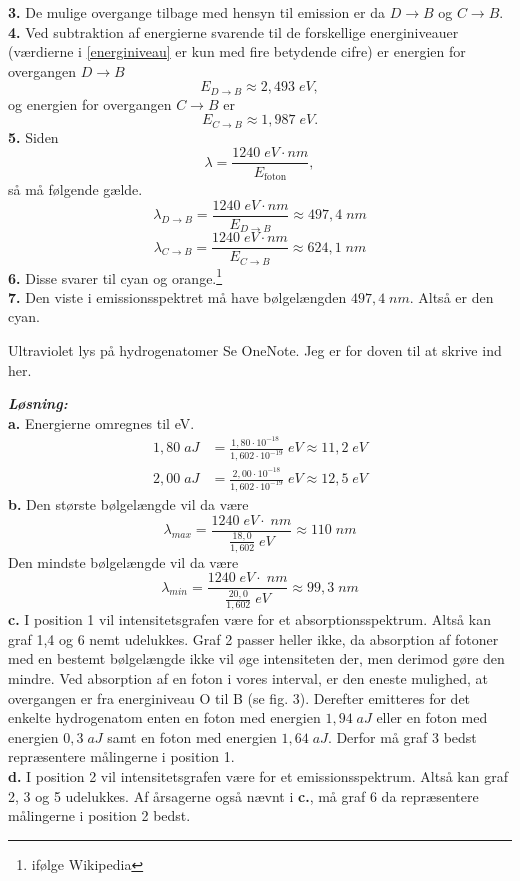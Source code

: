 \documentclass{report}
\newcommand{\sol}{\setlength{\parindent}{0cm}\textbf{\textit{Løsning:}}\setlength{\parindent}{1cm}}
\begin{document}
\noindent \textbf{3.} De mulige overgange tilbage med hensyn til emission er da $D\rightarrow B$ og $C\rightarrow B$.\\[1ex]
\textbf{4.} Ved subtraktion af energierne svarende til de forskellige energiniveauer (værdierne i \cref{energiniveau} er kun med fire betydende cifre) er energien for overgangen $D\rightarrow B$
\[
E_{D\rightarrow B} \approx 2,493 \;\unit{eV} ,
\] 
og energien for overgangen $C\rightarrow B$ er
\[
E _{C\rightarrow B}\approx 1,987 \;\unit{eV}.
\] 
\textbf{5.} Siden 
\[
\lambda = \frac{1240 \;\unit{eV}\cdot \unit{nm} }{E_{\text{foton}}},
\] 
så må følgende gælde.
\[
\lambda_{D\rightarrow B} = \frac{1240 \;\unit{eV}\cdot \unit{nm} }{E_{D\rightarrow B}} \approx 497,4 \;\unit{nm} 
\] 
\[
\lambda_{C\rightarrow B} = \frac{1240 \;\unit{eV}\cdot \unit{nm} }{E_{C\rightarrow B}} \approx 624,1\;\unit{nm} 
\] 
\textbf{6.} Disse svarer til cyan og orange.\footnote{ifølge Wikipedia}\\[1ex]
\textbf{7.} Den viste i emissionsspektret må have bølgelængden $497,4 \;\unit{nm} $. Altså er den cyan.
\begin{question}{Ultraviolet lys på hydrogenatomer}{}
Se OneNote. Jeg er for doven til at skrive ind her.
\end{question}
\sol \\ 
\textbf{a.} Energierne omregnes til \unit{eV}.
\begin{equation*}
\begin{split}
  1,80 \;\unit{aJ}&=\frac{1,80\cdot 10^{-18}\;}{1,602\cdot 10^{-19}} \;\unit{eV} \approx 11,2 \;\unit{eV} \\
  2,00 \;\unit{aJ}&=\frac{2,00\cdot 10^{-18}}{1,602\cdot 10^{-19}} \;\unit{eV} \approx 12,5 \;\unit{eV} 
\end{split}
\end{equation*}
\textbf{b.} Den største bølgelængde vil da være
\[
\lambda_{max}=\frac{1240 \;\unit{eV} \cdot \;\unit{nm} }{\frac{18,0}{1,602}\;\unit{eV} } \approx 110 \;\unit{nm}
\] 
Den mindste bølgelængde vil da være
\[
\lambda_{min}=\frac{1240 \;\unit{eV} \cdot \;\unit{nm} }{\frac{20,0}{1,602}\;\unit{eV} } \approx 99,3\;\unit{nm}
\] 
\textbf{c.} I position 1 vil intensitetsgrafen være for et absorptionsspektrum. Altså kan graf 1,4 og 6 nemt udelukkes. 
Graf 2 passer heller ikke, da absorption af fotoner med en bestemt bølgelængde ikke vil øge intensiteten der, men derimod gøre den mindre.
Ved absorption af en foton i vores interval, er den eneste mulighed, at overgangen er fra energiniveau O til B (se fig. 3). 
Derefter emitteres for det enkelte hydrogenatom enten en foton med energien $1,94 \;\unit{aJ} $ eller en foton med energien $0,3 \;\unit{aJ} $ samt en foton med energien $1,64 \;\unit{aJ} $. 
Derfor må graf 3 bedst repræsentere målingerne i position 1. \\[1ex]
\textbf{d.} I position 2 vil intensitetsgrafen være for et emissionsspektrum. Altså kan graf 2, 3 og 5 udelukkes. 
Af årsagerne også nævnt i \textbf{c.}, må graf 6 da repræsentere målingerne i position 2 bedst. 
\end{document}
